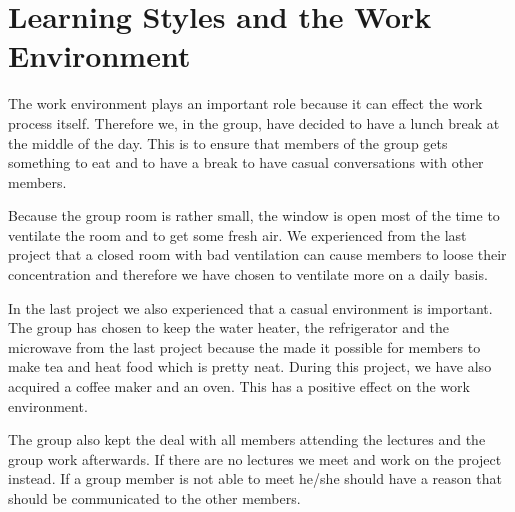 \section{Learning Styles and the Work Environment}
The work environment plays an important role because it can effect the work process itself. Therefore we, in the group, have decided to have a lunch break at the middle of the day. This is to ensure that members of the group gets something to eat and to have a break to have casual conversations with other members.

Because the group room is rather small, the window is open most of the time to ventilate the room and to get some fresh air. We experienced from the last project that a closed room with bad ventilation can cause members to loose their concentration and therefore we have chosen to ventilate more on a daily basis.

In the last project we also experienced that a casual environment is important. The group has chosen to keep the water heater, the refrigerator and the microwave from the last project because the made it possible for members to make tea and heat food which is pretty neat. During this project, we have also acquired a coffee maker and an oven. This has a positive effect on the work environment.

The group also kept the deal with all members attending the lectures and the group work afterwards. If there are no lectures we meet and work on the project instead.
If a group member is not able to meet he/she should have a reason that should be communicated to the other members.